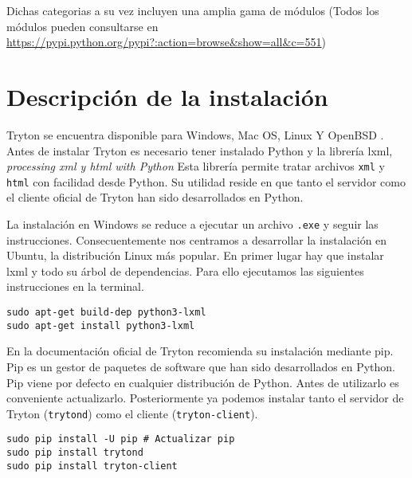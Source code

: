 \documentclass{article}
\begin{document}
Dichas categorias a su vez incluyen una amplia gama de módulos (Todos los módulos pueden consultarse en \url{https://pypi.python.org/pypi?:action=browse&show=all&c=551})


\section{Descripción de la instalación}

Tryton se encuentra disponible para Windows, Mac OS, Linux Y OpenBSD \cite{descarga}. Antes de instalar Tryton es necesario tener instalado Python y la librería lxml, \emph{processing xml y html with Python} \cite{lxml} Esta librería permite tratar archivos \texttt{xml} y \texttt{html} con facilidad desde Python. Su utilidad reside en que tanto el servidor como el cliente oficial de Tryton han sido desarrollados en Python.

La instalación en Windows se reduce a ejecutar un archivo \texttt{.exe} y seguir las instrucciones. Consecuentemente nos centramos a desarrollar la instalación en Ubuntu, la distribución Linux más popular. En primer lugar hay que instalar lxml y todo su árbol de dependencias. Para ello ejecutamos las siguientes instrucciones en la terminal.

\begin{verbatim}
sudo apt-get build-dep python3-lxml
sudo apt-get install python3-lxml
\end{verbatim}

En la documentación oficial de Tryton recomienda su instalación mediante pip. Pip es un gestor de paquetes de software que han sido desarrollados en Python.  Pip viene por defecto en cualquier distribución de Python. Antes de utilizarlo es conveniente actualizarlo. Posteriormente ya podemos instalar tanto el servidor de Tryton (\texttt{trytond}) como el cliente (\texttt{tryton-client}).

\begin{verbatim}
sudo pip install -U pip # Actualizar pip
sudo pip install trytond
sudo pip install tryton-client
\end{verbatim}
\end{document}
